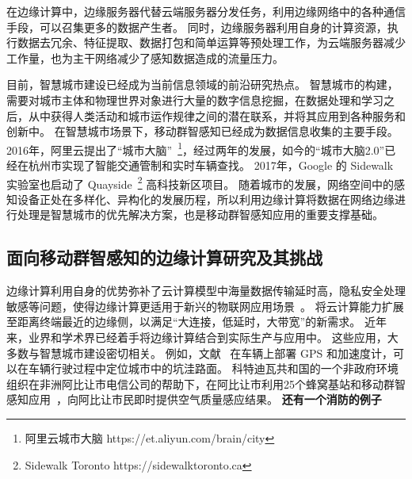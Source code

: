 在边缘计算中，边缘服务器代替云端服务器分发任务，利用边缘网络中的各种通信手段，可以召集更多的数据产生者。
同时，边缘服务器利用自身的计算资源，执行数据去冗余、特征提取、数据打包和简单运算等预处理工作，为云端服务器减少工作量，也为主干网络减少了感知数据造成的流量压力。


目前，智慧城市建设已经成为当前信息领域的前沿研究热点。
智慧城市的构建，需要对城市主体和物理世界对象进行大量的数字信息挖掘，在数据处理和学习之后，从中获得人类活动和城市运作规律之间的潜在联系，并将其应用到各种服务和创新中。
在智慧城市场景下，移动群智感知已经成为数据信息收集的主要手段。
2016年，阿里云提出了“城市大脑”~\footnote{阿里云城市大脑 https://et.aliyun.com/brain/city}，经过两年的发展，如今的“城市大脑2.0”已经在杭州市实现了智能交通管制和实时车辆查找。
2017年，Google 的 Sidewalk 实验室也启动了 Quayside~\footnote{Sidewalk Toronto https://sidewalktoronto.ca} 高科技新区项目。
随着城市的发展，网络空间中的感知设备正处在多样化、异构化的发展历程，所以利用边缘计算将数据在网络边缘进行处理是智慧城市的优先解决方案，也是移动群智感知应用的重要支撑基础。

\subsection{面向移动群智感知的边缘计算研究及其挑战}


边缘计算利用自身的优势弥补了云计算模型中海量数据传输延时高，隐私安全处理敏感等问题，使得边缘计算更适用于新兴的物联网应用场景~\cite{DBLP:journals/cm/SunA16}。
将云计算能力扩展至距离终端最近的边缘侧，以满足“大连接，低延时，大带宽”的新需求。
近年来，业界和学术界已经着手将边缘计算结合到实际生产与应用中。
这些应用，大多数与智慧城市建设密切相关。
例如，文献~\cite{DBLP:journals/cm/GantiYL11} 在车辆上部署 GPS 和加速度计，可以在车辆行驶过程中定位城市中的坑洼路面。
科特迪瓦共和国的一个非政府环境组织在非洲阿比让市电信公司的帮助下，在阿比让市利用25个蜂窝基站和移动群智感知应用~\cite{DBLP:conf/huc/ZhangXWC14}，向阿比让市民即时提供空气质量感应结果。
\textbf{还有一个消防的例子}

